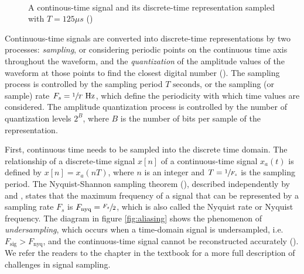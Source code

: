 \documentclass[report.tex]{subfiles}
\begin{document}
\begin{figure}[ht]
	\centering
	\\
	\caption{A continous-time signal and its discrete-time representation sampled with $T = 125\mu s$ (\cite[Chapter~2]{discretebook})}
	\label{fig:discretecontinuous}
\end{figure}

\newpagefill

Continuous-time signals are converted into discrete-time representations by two processes: \textit{sampling}, or considering periodic points on the continuous time axis throughout the waveform, and the \textit{quantization} of the amplitude values of the waveform at those points to find the closest digital number (\cite[Chapter~2]{melbook}). The sampling process is controlled by the sampling period $T \text{ seconds}$, or the sampling (or sample) rate $F_{s} = \sfrac{1}{T} \text{ Hz}$, which define the periodicity with which time values are considered. The amplitude quantization process is controlled by the number of quantization levels $2^{B}$, where $B$ is the number of bits per sample of the representation.

First, continuous time needs to be sampled into the discrete time domain. The relationship of a discrete-time signal $x[n]$ of a continuous-time signal $x_{a}(t)$ is defined by $x[n] = x_{a}(nT)$, where $n$ is an integer and $T = \sfrac{1}{F_{s}}$ is the sampling period. The Nyquist-Shannon sampling theorem (\cite[Chapter~4]{discretebook}), described independently by \textcite{nyquist1928} and \textcite{shannon1948}, states that the maximum frequency of a signal that can be represented by a sampling rate $F_{s}$ is $F_{\text{nyq}} = \sfrac{F_{s}}{2}$, which is also called the Nyquist rate or Nyquist frequency. The diagram in figure \ref{fig:aliasing} shows the phenomenon of \textit{undersampling}, which occurs when a time-domain signal is undersampled, i.e. $F_{\text{sig}} > F_{\text{nyq}}$, and the continuous-time signal cannot be reconstructed accurately (\cite[Chapter~4]{dspfirst}). We refer the readers to the chapter in the textbook for a more full description of challenges in signal sampling.
\end{document}
